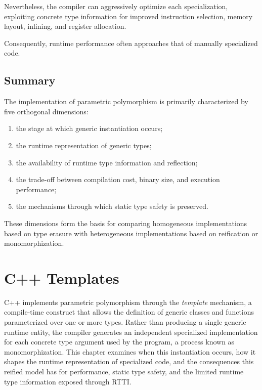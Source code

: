 \documentclass[11pt]{report}
\begin{document}
Nevertheless, the compiler can aggressively optimize each specialization,
exploiting concrete type information for improved instruction selection, memory
layout, inlining, and register allocation.


Consequently, runtime performance often approaches that of manually specialized
code.



\label{Introduction: Summary}
\section{Summary}


The implementation of parametric polymorphism is primarily characterized by five
orthogonal dimensions:

\begin{enumerate}
    \item the stage at which generic instantiation occurs;
    \item the runtime representation of generic types;
    \item the availability of runtime type information and reflection;
    \item the trade-off between compilation cost, binary size, and execution
          performance;
    \item the mechanisms through which static type safety is preserved.
\end{enumerate}


These dimensions form the basis for comparing homogeneous implementations based
on type erasure with heterogeneous implementations based on reification or
monomorphization.
\chapter{C++ Templates}
\label{CppTemplates}
C++ implements parametric polymorphism through the \emph{template}
mechanism, a compile-time construct that allows the definition of generic
classes and functions parameterized over one or more types. Rather than
producing a single generic runtime entity, the compiler generates an
independent specialized implementation for each concrete type argument
used by the program, a process known as monomorphization. This chapter
examines when this instantiation occurs, how it shapes the runtime
representation of specialized code, and the consequences this reified
model has for performance, static type safety, and the limited runtime
type information exposed through RTTI.
\end{document}
